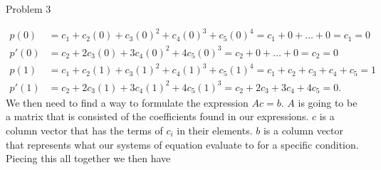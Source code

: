\begin{problem}{Problem 3}
\begin{Highlight}[Solution]
        \begin{align}
            p(0) & = c_{1} + c_{2}(0) + c_{3}(0)^{2} + c_{4}(0)^{3} + c_{5}(0)^{4} = c_{1} + 0 + \dots + 0 = c_{1} = 0 \\
            p'(0) & = c_{2} + 2c_{3}(0) + 3c_{4}(0)^{2} + 4c_{5}(0)^{3} = c_{2} + 0 + \dots + 0 = c_{2} = 0 \\
            p(1) & = c_{1} + c_{2}(1) + c_{3}(1)^{2} + c_{4}(1)^{3} + c_{5}(1)^{4} = c_{1} + c_{2} + c_{3} + c_{4} + c_{5} = 1 \\
            p'(1) & = c_{2} + 2c_{3}(1) + 3c_{4}(1)^{2} + 4c_{5}(1)^{3} = c_{2} + 2c_{3} + 3c_{4} + 4c_{5} = 0.
        \end{align}
        We then need to find a way to formulate the expression $Ac = b$. $A$ is going to be a matrix that is consisted of the coefficients found in our expressions. $c$ is a column vector that has the
        terms of $c_{i}$ in their elements. $b$ is a column vector that represents what our systems of equation evaluate to for a specific condition. Piecing this all together we then have


\end{Highlight}
\end{problem}
